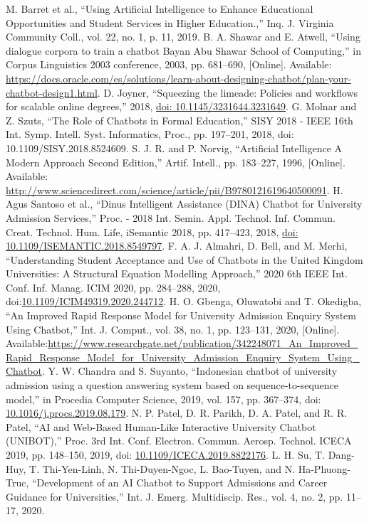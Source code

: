 \documentclass[conference]{IEEEtran}
\begin{document}
\begin{thebibliography}{00}
M. Barret et al., “Using Artificial Intelligence to Enhance Educational Opportunities and Student Services in Higher Education.,” Inq. J. Virginia Community Coll., vol. 22, no. 1, p. 11, 2019.
B. A. Shawar and E. Atwell, “Using dialogue corpora to train a chatbot Bayan Abu Shawar School of Computing,” in Corpus Linguistics 2003 conference, 2003, pp. 681–690, [Online]. Available: \url{https://docs.oracle.com/es/solutions/learn-about-designing-chatbot/plan-your-chatbot-design1.html}.
D. Joyner, “Squeezing the limeade: Policies and workflows for scalable online degrees,” 2018, \url{doi: 10.1145/3231644.3231649}.
G. Molnar and Z. Szuts, “The Role of Chatbots in Formal Education,” SISY 2018 - IEEE 16th Int. Symp. Intell. Syst. Informatics, Proc., pp. 197–201, 2018, {doi: 10.1109/SISY.2018.8524609}.
S. J. R. and P. Norvig, “Artificial Intelligence A Modern Approach Second Edition,” Artif. Intell., pp. 183–227, 1996, [Online]. Available: \url{http://www.sciencedirect.com/science/article/pii/B9780121619640500091}.
H. Agus Santoso et al., “Dinus Intelligent Assistance (DINA) Chatbot for University Admission Services,” Proc. - 2018 Int. Semin. Appl. Technol. Inf. Commun. Creat. Technol. Hum. Life, iSemantic 2018, pp. 417–423, 2018, \url{doi: 10.1109/ISEMANTIC.2018.8549797}.
F. A. J. Almahri, D. Bell, and M. Merhi, “Understanding Student Acceptance and Use of Chatbots in the United Kingdom Universities: A Structural Equation Modelling Approach,” 2020 6th IEEE Int. Conf. Inf. Manag. ICIM 2020, pp. 284–288, 2020, doi:\url{10.1109/ICIM49319.2020.244712}.
H. O. Gbenga, Oluwatobi and T. Okedigba, “An Improved Rapid Response Model for University Admission Enquiry System Using Chatbot,” Int. J. Comput., vol. 38, no. 1, pp. 123–131, 2020, [Online]. Available:\url{https://www.researchgate.net/publication/342248071_An_Improved_Rapid_Response_Model_for_University_Admission_Enquiry_System_Using_Chatbot}.
Y. W. Chandra and S. Suyanto, “Indonesian chatbot of university admission using a question answering system based on sequence-to-sequence model,” in Procedia Computer Science, 2019, vol. 157, pp. 367–374, doi: \url{10.1016/j.procs.2019.08.179}.
N. P. Patel, D. R. Parikh, D. A. Patel, and R. R. Patel, “AI and Web-Based Human-Like Interactive University Chatbot (UNIBOT),” Proc. 3rd Int. Conf. Electron. Commun. Aerosp. Technol. ICECA 2019, pp. 148–150, 2019, doi: \url{10.1109/ICECA.2019.8822176}.
L. H. Su, T. Dang-Huy, T. Thi-Yen-Linh, N. Thi-Duyen-Ngoc, L. Bao-Tuyen, and N. Ha-Phuong-Truc, “Development of an AI Chatbot to Support Admissions and Career Guidance for Universities,” Int. J. Emerg. Multidiscip. Res., vol. 4, no. 2, pp. 11–17, 2020.

\end{thebibliography}
\end{document}
